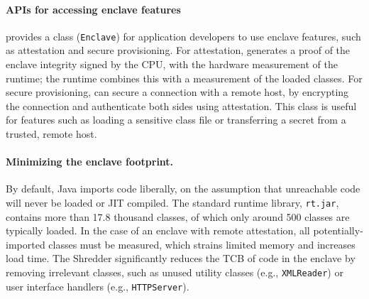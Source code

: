 



\paragraph{\java{} APIs for accessing enclave features}
\sysname{} provides a \java{} class ({\tt Enclave}) for application developers
to use enclave features, such as attestation and secure provisioning.
For attestation, \sysname{} generates a proof of the enclave integrity signed by the CPU,
with the hardware measurement of the \sysname{} runtime;
the \sysname{} runtime combines this with a measurement of the loaded classes.
For secure provisioning,
\sysname{} can secure a connection with a remote host,
by encrypting the connection and authenticate both sides using attestation.
This class is useful for features such as loading a sensitive class file or transferring
a secret 
from a trusted, remote host.

\paragraph{Minimizing the enclave footprint.}
By default, Java imports code liberally, on the assumption that unreachable code
will never be loaded or JIT compiled.
The standard runtime library, {\tt rt.jar}, contains more than 17.8 thousand classes, of which only around \roughly{}500 classes are typically loaded.
In the case of an enclave with
remote attestation, all potentially-imported classes must be measured,
which strains limited memory and increases load time.
The Shredder significantly reduces the TCB of code in the enclave by removing irrelevant classes, such as unused utility classes (e.g., {\tt XMLReader}) or  user interface handlers (e.g., {\tt HTTPServer}).

